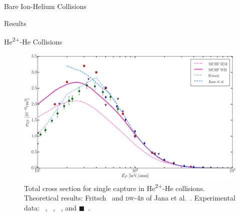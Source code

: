 \documentclass[a5paper, 9 pt]{extreport}
\begin{document}
\begin{chapter}{Bare Ion-Helium Collisions \label{chap:p-he2p-he}}
\begin{section}{Results \label{sec:phe2p-res}}
\begin{subsection}{\texorpdfstring{He\textsuperscript{2+}}{He2+}-He Collisions
                         \label{sec:he2phe-res}}
         \begin{figure}[t]
            \centering
            \includegraphics[width = 0.95 \linewidth]{./images/he2phe/he2phe-TP.eps}
            \caption[Total cross section for single capture in He\textsuperscript{2+}-He
                     collisions.]{Total cross section for single capture in He\textsuperscript{2+}-He
                     collisions. Theoretical results: Fritsch~\cite{Fritsch-94} and \textsc{dw-4b} of
                     Jana et al.~\cite{JMP-15}.
                     Experimental data: {\color{blue}{$\blacklozenge$}}~\cite{SG85},
                     {\color{OliveGreen}{$\bullet$}}~\cite{SG89},
                     {\color{RedViolet}{$\blacktriangledown$}}~\cite{Dubois87}, and
                     {\color{red}$\blacksquare$}~\cite{Rudd85}. \label{fig:he2phe-tp}}
         \end{figure}


\end{subsection}
\end{section}
\end{chapter}
\end{document}
